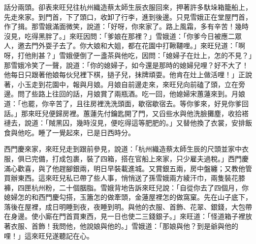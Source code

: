 話分兩頭。卻表來旺兒往杭州織造蔡太師生辰衣服回來，押著許多馱垛箱籠船上，先走來家。到門首，下了頭口，收卸了行李，進到後邊。只見雪娥正在堂屋門首，作了揖。那雪娥滿面微笑，說道：「好呀，你來家了。路上風霜，多有辛苦！幾時沒見，吃得黑胖了。」來旺因問：「爹娘在那裡？」雪娥道：「你爹今日被應二眾人，邀去門外耍子去了。你大娘和大姐，都在花園中打鞦韆哩。」來旺兒道：「啊呀，打他則甚？」雪娥便倒了一盞茶與他吃，因問：「媳婦子在灶上，怎的不見？」那雪娥冷笑了一聲，說道：「你的媳婦子，如今還是那時的媳婦兒哩？好不大了！他每日只跟著他娘每伙兒裡下棋，撾子兒，抹牌頑耍。他肯在灶上做活哩！」正說著，小玉走到花園中，報與月娘。月娘自前邊走來，來旺兒向前磕了頭，立在旁邊。問了些路上往回的話，月娘賞了兩瓶酒。吃一回，他媳婦宋蕙蓮來到。月娘道：「也罷，你辛苦了，且往房裡洗洗頭面，歇宿歇宿去。等你爹來，好見你爹回話。」那來旺兒便歸房裡。蕙蓮先付鑰匙開了門，又舀些水與他洗臉攤塵，收拾褡褳去，說道：「賊黑囚，幾時沒見，便吃得這等肥肥的。」又替他換了衣裳，安排飯食與他吃。睡了一覺起來，已是日西時分。

西門慶來家，來旺兒走到跟前參見，說道：「杭州織造蔡太師生辰的尺頭並家中衣服，俱已完備，打成包裹，裝了四箱，搭在官船上來家，只少雇夫過稅。」西門慶滿心歡喜，與了他趕腳銀兩，明日早裝載進城。又賞銀五兩，房中盤纏；又教他管買辦東西。這來旺兒私已帶了些人事，悄悄送了孫雪娥兩方綾汗巾，兩隻裝花膝褲，四匣杭州粉，二十個胭脂。雪娥背地告訴來旺兒說：「自從你去了四個月，你媳婦怎的和西門慶勾搭，玉簫怎的做牽頭，金蓮屋裡怎的做窩窠。先在山子底下，落後在屋裡，成日明睡到夜，夜睡到明。與他的衣服、首飾、花翠、銀錢，大包帶在身邊。使小廝在門首買東西，見一日也使二三錢銀子。」來旺道：「怪道箱子裡放著衣服、首飾！我問他，他說娘與他的。」雪娥道：「那娘與他？到是爺與他的哩！」這來旺兒遂聽記在心。

